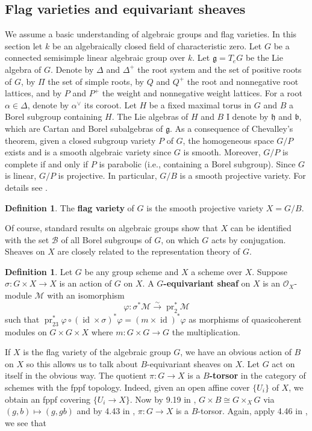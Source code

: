 \documentclass[11pt, a4paper]{article}
\theoremstyle{definition}
\newtheorem{definition}[theorem]{Definition}
\newcommand{\s}[0]{\sigma}
\newcommand{\D}[0]{\Delta}
\newcommand{\id}[0]{\operatorname{id}}
\newcommand{\h}{\mathfrak h}
\renewcommand{\b}{\mathfrak b}
\newcommand{\g}{\mathfrak g}
\begin{document}
    \subsection{Flag varieties and equivariant sheaves}
    We assume a basic understanding of algebraic groups and flag varieties. In this section let $k$ be an algebraically closed field of characteristic zero. Let $G$ be a connected semisimple linear algebraic group over $k$. Let $\g=T_eG$ be the Lie algebra of $G$. Denote by $\D$ and $\D^+$ the root system and the set of positive roots of $G$, by $\Pi$ the set of simple roots, by $Q$ and $Q^+$ the root and nonnegative root lattices, and by $P$ and $P^+$ the weight and nonnegative weight lattices. For a root $\alpha\in \D$, denote by $\alpha^\vee$ its coroot. Let $H$ be a fixed maximal torus in $G$ and $B$ a Borel subgroup containing $H$. The Lie algebras of $H$ and $B$ I denote by $\h$ and $\b$, which are Cartan and Borel subalgebras of $\g$. As a consequence of Chevalley's theorem, given a closed subgroup variety $P$ of $G$, the homogeneous space $G/P$ exists and is a smooth algebraic variety since $G$ is smooth. Moreover, $G/P$ is complete if and only if $P$ is parabolic (i.e., containing a Borel subgroup). Since $G$ is linear, $G/P$ is projective. In particular, $G/B$ is a smooth projective variety. For details see \cite{milne-groups}.
    \begin{definition}
        The \textbf{flag variety} of $G$ is the smooth projective variety $X=G/B$.
    \end{definition}
    Of course, standard results on algebraic groups show that $X$ can be identified with the set $\mathcal B$ of all Borel subgroups of $G$, on which $G$ acts by conjugation. Sheaves on $X$ are closely related to the representation theory of $G$.
    \newcommand{\pr}{\operatorname{pr}}
    \begin{definition}
        Let $G$ be any group scheme and $X$ a scheme over $X$. Suppose $\s:G\times X\to X$ is an action of $G$ on $X$. A \textbf{$G$-equivariant sheaf} on $X$ is an $\mathcal O_X$-module $\mathcal M$ with an isomorphism
        \[\varphi:\s^*\mathcal M\xrightarrow{\sim}\pr_2^*\mathcal M\]
        such that $\pr_{23}^*\varphi\circ(\id\times\s)^*\varphi=(m\times\id)^*\varphi$ as morphisms of quasicoherent modules on $G\times G\times X$ where $m:G\times G\to G$ the multiplication.
    \end{definition}
    If $X$ is the flag variety of the algebraic group $G$, we have an obvious action of $B$ on $X$ so this allows us to talk about $B$-equivariant sheaves on $X$. Let $G$ act on itself in the obvious way. The quotient $\pi:G\to X$ is a \textbf{$B$-torsor} in the category of schemes with the fppf topology. Indeed, given an open affine cover $\{U_i\}$ of $X$, we obtain an fppf covering $\{U_i\to X\}$. Now by 9.19 in \cite{milne-groups}, $G\times B\cong G\times_X G$ via $(g, b)\mapsto (g, gb)$ and by 4.43 in \cite{fantechi-fundamental}, $\pi:G\to X$ is a $B$-torsor. Again, apply 4.46 in \cite{fantechi-fundamental}, we see that
\end{document}
